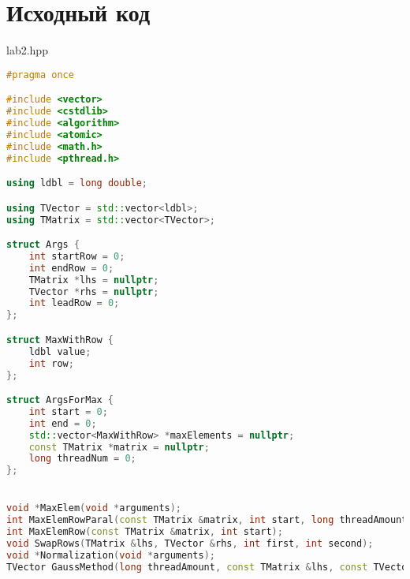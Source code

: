 \documentclass[a4paper, 12pt]{article}
\begin{document}
\section{Исходный код}
lab2.hpp
\begin{lstlisting}[language=C++]
#pragma once

#include <vector>
#include <cstdlib>
#include <algorithm>
#include <atomic>
#include <math.h>
#include <pthread.h>

using ldbl = long double;

using TVector = std::vector<ldbl>;
using TMatrix = std::vector<TVector>;

struct Args {
    int startRow = 0;
    int endRow = 0;
    TMatrix *lhs = nullptr;
    TVector *rhs = nullptr;
    int leadRow = 0;
};

struct MaxWithRow {
    ldbl value;
    int row;
};

struct ArgsForMax {
    int start = 0;
    int end = 0;
    std::vector<MaxWithRow> *maxElements = nullptr;
    const TMatrix *matrix = nullptr;
    long threadNum = 0;
};


void *MaxElem(void *arguments);
int MaxElemRowParal(const TMatrix &matrix, int start, long threadAmount);
int MaxElemRow(const TMatrix &matrix, int start);
void SwapRows(TMatrix &lhs, TVector &rhs, int first, int second);
void *Normalization(void *arguments);
TVector GaussMethod(long threadAmount, const TMatrix &lhs, const TVector &rhs);
\end{lstlisting}
\end{document}
